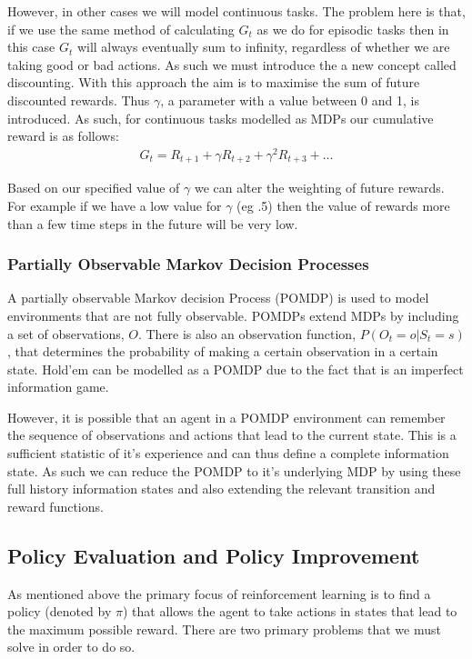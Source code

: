 However, in other cases we will model continuous tasks.
The problem here is that, if we use the same method of calculating $G_t$ as we do for
episodic tasks then in this case $G_t$ will always eventually sum to infinity, regardless
of whether we are taking good or bad actions.
As such we must introduce the a new concept called discounting.
With this approach the aim is to maximise the sum of future discounted rewards.
Thus $\gamma$, a parameter with a value between 0 and 1, is introduced.
As such, for continuous tasks modelled as MDPs our cumulative reward is as follows:
\begin{align}
    G_t = R_{t+1}+\gamma R_{t+2}+\gamma^{2}R_{t+3}+\dots
\end{align}

Based on our specified value of $\gamma$ we can alter the weighting of future rewards.
For example if we have a low value for $\gamma$ (eg .5) then the value of rewards more than a
few time steps in the future will be very low.

\subsubsection{Partially Observable Markov Decision Processes}
A partially observable Markov decision Process (POMDP) is used to model environments that are not
fully observable\citep{kaelbling1996reinforcement}.
POMDPs extend MDPs by including a set of observations, $O$.
There is also an observation function, $P(O_t=o|S_t=s)$, that determines the probability of making a certain observation
in a certain state.
Hold'em can be modelled as a POMDP due to the fact that is an imperfect information game.

However, it is possible that an agent in a POMDP environment can remember the sequence of observations
and actions that lead to the current state.
This is a sufficient statistic of it's experience and can thus define a complete information
state\citep{heinrich2017reinforcement}.
As such we can reduce the POMDP to it's underlying MDP by using these full history information
states and also extending the relevant transition and reward functions.


\subsection{Policy Evaluation and Policy Improvement}\label{subsec:policyEvalPolicyImp}
As mentioned above the primary focus of reinforcement learning is to find a policy (denoted by $\pi$) that allows
the agent to take actions in states that lead to the maximum possible reward.
There are two primary problems that we must solve in order to do so.


